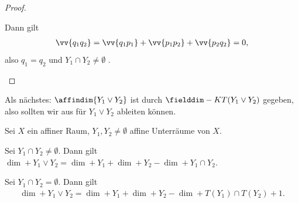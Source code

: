 \begin{proof}
\begin{proofdescription}
\begin{figure}[H]
             \label{fig:verbindungsraum_translationen_schnitt_leer_verbindungslinie_nicht_in_translationen}
         \end{figure}
         Dann gilt
         \begin{align*}
             \vv{q_1 q_2}=\vv{q_1 p_1}+\vv{p_1 p_2}+\vv{p_2 q_2}=0,
         \end{align*}
         also \( q_1=q_2 \) und \( Y_1\cap Y_2\neq \emptyset \) \contra.
    \end{proofdescription}
\end{proof}
Als nächstes: \( \affindim{Y_1\vee Y_2} \) ist durch \( \fielddim-{K}{T(Y_1\vee Y_2)} \) gegeben, also sollten wir aus  für \( Y_1\vee Y_2 \) ableiten können.
\begin{lemma}\label{verbindungsraum:dimension}
    Sei \( X \) ein affiner Raum, \( Y_1, Y_2\neq \emptyset \) affine Unterräume von \( X \).
    \begin{eigenschaftenenumerate}
        \item\label{verbindungsraum:dimension:schnitt_nicht_leer} Sei \( Y_1\cap Y_2\neq \emptyset \).
         Dann gilt \( \dim+{Y_1\vee Y_2}=\dim+{Y_1}+\dim+{Y_2}-\dim+{Y_1\cap Y_2} \).
        \item\label{verbindungsraum:dimension:schnitt_leer} Sei \( Y_1\cap Y_2=\emptyset \).
        Dann gilt
        \begin{align*}
            \dim+{Y_1\vee Y_2}=\dim+{Y_1}+\dim+{Y_2}-\dim+{T(Y_1)\cap T(Y_2)}+1.
        \end{align*}
    \end{eigenschaftenenumerate}
    
\end{lemma}
